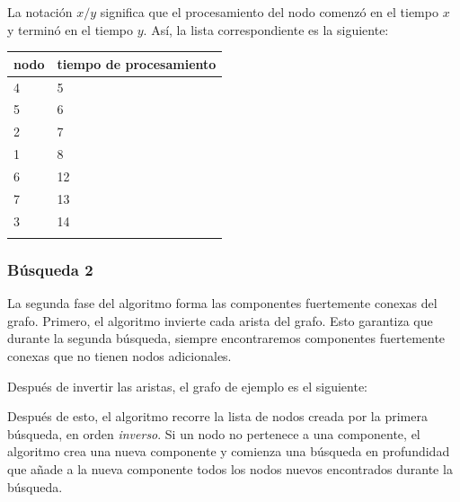 La notación $x/y$ significa que
el procesamiento del nodo comenzó
en el tiempo $x$ y terminó en el tiempo $y$.
Así, la lista correspondiente es la siguiente:

\begin{tabular}{ll}
\\
nodo & tiempo de procesamiento \\
\hline
4 & 5 \\
5 & 6 \\
2 & 7 \\
1 & 8 \\
6 & 12 \\
7 & 13 \\
3 & 14 \\
\\
\end{tabular}
%

\subsubsection{Búsqueda 2}

La segunda fase del algoritmo
forma las componentes fuertemente conexas
del grafo.
Primero, el algoritmo invierte cada
arista del grafo.
Esto garantiza que durante la segunda búsqueda,
siempre encontraremos componentes fuertemente
conexas que no tienen nodos adicionales.

Después de invertir las aristas,
el grafo de ejemplo es el siguiente:
\begin{center}
\end{center}

Después de esto, el algoritmo recorre
la lista de nodos creada por la primera búsqueda,
en orden \emph{inverso}.
Si un nodo no pertenece a una componente,
el algoritmo crea una nueva componente
y comienza una búsqueda en profundidad
que añade a la nueva componente todos los nodos nuevos
encontrados durante la búsqueda.

